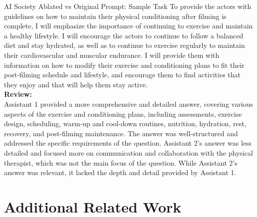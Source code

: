 \begin{AIBoxBreak}{AI Society Ablated vs Original Prompt: Sample Task}
	To provide the actors with guidelines on how to maintain their physical conditioning after filming is complete, I will emphasize the importance of continuing to exercise and maintain a healthy lifestyle. I will encourage the actors to continue to follow a balanced diet and stay hydrated, as well as to continue to exercise regularly to maintain their cardiovascular and muscular endurance. I will provide them with information on how to modify their exercise and conditioning plans to fit their post-filming schedule and lifestyle, and encourage them to find activities that they enjoy and that will help them stay active.
	\\

	\textbf{Review:}\\ Assistant 1 provided a more comprehensive and detailed answer, covering various aspects of the exercise and conditioning plans, including assessments, exercise design, scheduling, warm-up and cool-down routines, nutrition, hydration, rest, recovery, and post-filming maintenance. The answer was well-structured and addressed the specific requirements of the question. Assistant 2's answer was less detailed and focused more on communication and collaboration with the physical therapist, which was not the main focus of the question. While Assistant 2's answer was relevant, it lacked the depth and detail provided by Assistant 1.

\end{AIBoxBreak}



\section{Additional Related Work}

